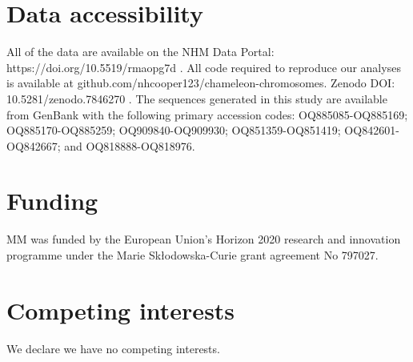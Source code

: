 \documentclass[a4paper, 12pt]{article}
\begin{document}
\section{Data accessibility}\label{data-code-and-materials}
All of the data are available on the NHM Data Portal: https://doi.org/10.5519/rmaopg7d \citep{chameleon-data}. 
All code required to reproduce our analyses is available at github.com/nhcooper123/chameleon-chromosomes. Zenodo DOI: 10.5281/zenodo.7846270 \citep{coopercode2022}. 
The sequences generated in this study are available from GenBank with the following primary accession codes: OQ885085-OQ885169; OQ885170-OQ885259; OQ909840-OQ909930; OQ851359-OQ851419; OQ842601-OQ842667; and OQ818888-OQ818976.

\section{Funding}
MM was funded by the European Union’s Horizon 2020 research and innovation programme under the Marie Sk\l{}odowska-Curie grant agreement No 797027.

\section{Competing interests}
We declare we have no competing interests.
\end{document}
